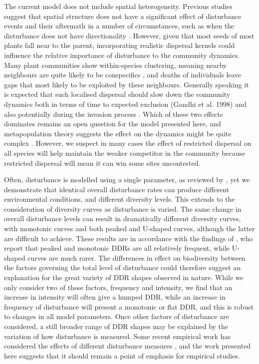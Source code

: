 The current model does not include spatial heterogeneity. Previous studies suggest that spatial structure does not have a significant effect of disturbance events and their aftermath in a number of circumstances, such as when the disturbance does not have directionality \citep{frelich1991natural}. However, given that most seeds of most plants fall near to the parent, incorporating realistic dispersal kernels could influence the relative importance of disturbance to the community dynamics. Many plant communities show within-species clustering, meaning nearby neighbours are quite likely to be conspecifics \citep{condit2000spatial,murrell2001uniting}, and deaths of individuals leave gaps that most likely to be exploited by these neighbours. Generally speaking it is expected that such localised dispersal should slow down the community dynamics both in terms of time to expected exclusion (Gandhi et al. 1998) and also potentially during the invasion process \citep{murrell2010does}. Which of these two effects dominates remains an open question for the model presented here, and metapopulation theory suggests the effect on the dynamics might be quite complex \citep{ovaskainen2002transient}. However, we suspect in many cases the effect of restricted dispersal on all species will help maintain the weaker competitor in the community because restricted dispersal will mean it can win some sites uncontested.

Often, disturbance is modelled using a single parameter, as reviewed by \cite{shea2004moving}, yet we demonstrate that identical overall disturbance rates can produce different environmental conditions, and different diversity levels. This extends to the consideration of diversity curves as disturbance is varied. The same change in overall disturbance levels can result in dramatically different diversity curves, with monotonic curves and both peaked and U-shaped curves, although the latter are difficult to achieve. These results are in accordance with the findings of \cite{mackey2001diversity}, who report that peaked and monotonic DDRs are all relatively frequent, while U-shaped curves are much rarer. The differences in effect on biodiversity between the factors governing the total level of disturbance could therefore suggest an explanation for the great variety of DDR shapes observed in nature. While we only consider two of these factors, frequency and intensity, we find that an increase in intensity will often give a humped DDR, while an increase in frequency of disturbance will present a monotonic or flat DDR, and this is robust to changes in all model parameters. Once other factors of disturbance are considered, a still broader range of DDR shapes may be explained by the variation of how disturbance is measured. Some recent empirical work has considered the effects of different disturbance measures \citep[e.g.][]{bertocci2005contrasting,collins1987interaction,svensson2009equal}, and the work presented here suggests that it should remain a point of emphasis for empirical studies.


